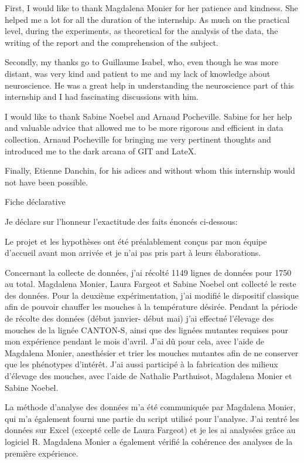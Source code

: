 \documentclass[a4paper, 12pt]{article}
\begin{document}
 \bigskip
	First, I would like to thank Magdalena Monier for her patience and kindness. She helped me a lot for all the duration of the internship. As much on the practical level, during the experiments, as theoretical for the analysis of the data, the writing of the report and the comprehension of the subject.
	
	Secondly, my thanks go to Guillaume Isabel, who, even though he was more distant, was very kind and patient to me and my lack of knowledge about neuroscience. He was a great help in understanding the neuroscience part of this internship and I had fascinating discussions with him.
	
	I would like to thank Sabine Noebel and Arnaud Pocheville. Sabine for her help and valuable advice that allowed me to be more rigorous and efficient in data collection. Arnaud Pocheville for bringing me very pertinent thoughts and introduced me to the dark arcana of GIT and LateX.
	
	Finally, Etienne Danchin, for his adices and without whom this internship would not have been possible.
	\clearpage
 \begin{LARGE}
Fiche déclarative
 \end{LARGE}


	Je déclare sur l'honneur l’exactitude des faits énoncés ci-dessous:
	
	Le projet et les hypothèses ont été préalablement conçus par mon équipe d’accueil avant mon arrivée et je n’ai pas pris part à leurs élaborations.
	
	Concernant la collecte de données, j’ai récolté 1149 lignes de données pour 1750 au total. Magdalena Monier, Laura Fargeot et Sabine Noebel ont collecté le reste des données. Pour la deuxième expérimentation, j’ai modifié le dispositif classique afin de pouvoir chauffer les mouches à la température désirée. 
	Pendant la période de récolte des données (début janvier- début mai) j’ai effectué l’élevage des mouches de la lignée CANTON-S, ainsi que des lignées mutantes requises pour mon expérience pendant le mois d’avril. J’ai dû pour cela, avec l’aide de Magdalena Monier, anesthésier et trier les mouches mutantes afin de ne conserver que les phénotypes d’intérêt. J’ai aussi participé à la fabrication des milieux d’élevage des mouches, avec l’aide de Nathalie Parthuisot, Magdalena Monier et Sabine Noebel.  
	
	La méthode d’analyse des données m’a été communiquée par Magdalena Monier, qui m’a également fourni une partie du script utilisé pour l’analyse. J’ai rentré les données sur Excel (excepté celle de Laura Fargeot) et je les ai analysées grâce au logiciel R. Magdalena Monier a également vérifié la cohérence des analyses de la première expérience.
	
\end{document}

